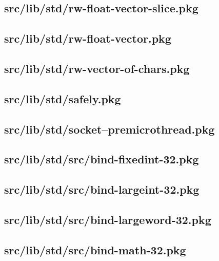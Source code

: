 \subsection{src/lib/std/rw-float-vector-slice.pkg}


\subsection{src/lib/std/rw-float-vector.pkg}


\subsection{src/lib/std/rw-vector-of-chars.pkg}


\subsection{src/lib/std/safely.pkg}


\subsection{src/lib/std/socket--premicrothread.pkg}


\subsection{src/lib/std/src/bind-fixedint-32.pkg}


\subsection{src/lib/std/src/bind-largeint-32.pkg}


\subsection{src/lib/std/src/bind-largeword-32.pkg}


\subsection{src/lib/std/src/bind-math-32.pkg}


